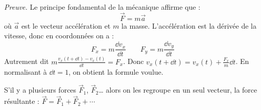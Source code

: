 \documentclass[11pt,class=report,crop=false]{standalone}
\begin{document}
\begin{cours}
\emph{Preuve.}
Le principe fondamental de la mécanique affirme que :
$$\vec F = m \vec a$$
où $\vec a$ est le vecteur accélération et $m$ la masse. L’accélération est la dérivée de la vitesse, donc en coordonnées on a :
$$F_x = m \frac{\dd v_x}{\dd t} \qquad  F_y = m \frac{\dd v_y}{\dd t}$$
Autrement dit $m\frac{v_x(t+\dd t) - v_x(t)}{\dd t} = F_x$.
Donc $v_x(t+\dd t) = v_x(t) + \frac{F_x}{m} \dd t$. En normalisant à $\dd t=1$, on obtient la formule voulue.
  
  
\medskip
S'il y a plusieurs forces $\vec F_1$, $\vec F_2$\ldots{} alors on les regroupe en un seul vecteur, la force résultante : $\vec F = \vec F_1 + \vec F_2 + \cdots$
\end{cours}



\end{document}
